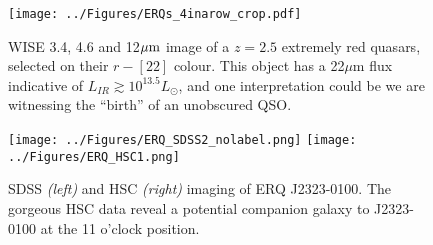 \documentclass[12pt]{article}
\begin{document}
\clearpage

%
%
\rationaletime          %



\clearpage

%
%
\justification          %



\setlength {\textwidth}{180mm} 
\begin{figure}[h]
  \begin{center}
    \hspace{-0.5cm}
    \texttt{[image: ../Figures/ERQs\_4inarow\_crop.pdf]}
    \vspace{-10pt}
    \caption{
      \footnotesize
      WISE 3.4, 4.6 and 12$\mu {\rm m}$ image of a $z=2.5$ 
      extremely red quasars, selected on their $r-[22]$ colour. This object
      has a 22$\mu$m flux indicative of $L_{IR} \gtrsim 10^{13.5} L_{\odot}$, 
      and one interpretation could be we are witnessing the
      ``birth'' of an unobscured QSO.  }
    \vspace{-14pt}
    \label{figtest-fig}
  \end{center}
\end{figure}

\hspace{-2.5cm}
\begin{figure}[h]
  \begin{center}
    \hspace{-0.5cm}
    \texttt{[image: ../Figures/ERQ\_SDSS2\_nolabel.png]}
    \texttt{[image: ../Figures/ERQ\_HSC1.png]}
    \vspace{-10pt}
    \caption{
      \footnotesize
      SDSS {\it (left)} and HSC {\it (right)} imaging of ERQ
      J2323-0100.  The gorgeous HSC data reveal a potential companion galaxy
      to J2323-0100 at the 11 o'clock position.}
    \vspace{-14pt}
    \label{figtest-fig}
  \end{center}
\end{figure}
\end{document}
